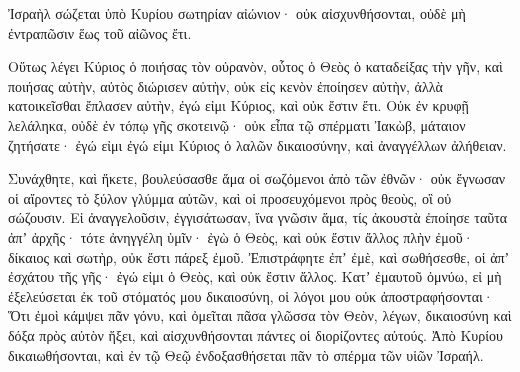 {Ἰσραὴλ σώζεται ὑπὸ Κυρίου σωτηρίαν αἰώνιον· οὐκ αἰσχυνθήσονται, οὐδὲ μὴ ἐντραπῶσιν ἕως τοῦ αἰῶνος ἔτι.
\par }{\PP {}Οὕτως λέγει Κύριος ὁ ποιήσας τὸν οὐρανὸν, οὗτος ὁ Θεὸς ὁ καταδείξας τὴν γῆν, καὶ ποιήσας αὐτὴν, αὐτὸς διώρισεν αὐτὴν, οὐκ εἰς κενὸν ἐποίησεν αὐτὴν, ἀλλὰ κατοικεῖσθαι ἔπλασεν αὐτὴν, ἐγώ εἰμι Κύριος, καὶ οὐκ ἔστιν ἔτι.
Οὐκ ἐν κρυφῇ λελάληκα, οὐδὲ ἐν τόπῳ γῆς σκοτεινῷ· οὐκ εἶπα τῷ σπέρματι Ἰακὼβ, μάταιον ζητήσατε· ἐγώ εἰμι ἐγώ εἰμι Κύριος ὁ λαλῶν δικαιοσύνην, καὶ ἀναγγέλλων ἀλήθειαν.
\par }{\PP {}Συνάχθητε, καὶ ἥκετε, βουλεύσασθε ἅμα οἱ σωζόμενοι ἀπὸ τῶν ἐθνῶν· οὐκ ἔγνωσαν οἱ αἴροντες τὸ ξύλον γλύμμα αὐτῶν, καὶ οἱ προσευχόμενοι πρὸς θεοὺς, οἳ οὐ σώζουσιν.
Εἰ ἀναγγελοῦσιν, ἐγγισάτωσαν, ἵνα γνῶσιν ἅμα, τίς ἀκουστὰ ἐποίησε ταῦτα ἀπʼ ἀρχῆς· τότε ἀνηγγέλη ὑμῖν· ἐγὼ ὁ Θεὸς, καὶ οὐκ ἔστιν ἄλλος πλὴν ἐμοῦ· δίκαιος καὶ σωτὴρ, οὐκ ἔστι πάρεξ ἐμοῦ.
Ἐπιστράφητε ἐπʼ ἐμὲ, καὶ σωθήσεσθε, οἱ ἀπʼ ἐσχάτου τῆς γῆς· ἐγώ εἰμι ὁ Θεὸς, καὶ οὐκ ἔστιν ἄλλος.
Κατʼ ἐμαυτοῦ ὀμνύω, εἰ μὴ ἐξελεύσεται ἐκ τοῦ στόματός μου δικαιοσύνη, οἱ λόγοι μου οὐκ ἀποστραφήσονται· Ὅτι ἐμοὶ κάμψει πᾶν γόνυ, καὶ ὀμεῖται πᾶσα γλῶσσα τὸν Θεὸν,
λέγων, δικαιοσύνη καὶ δόξα πρὸς αὐτὸν ἥξει, καὶ αἰσχυνθήσονται πάντες οἱ διορίζοντες αὐτούς.
Ἀπὸ Κυρίου δικαιωθήσονται, καὶ ἐν τῷ Θεῷ ἐνδοξασθήσεται πᾶν τὸ σπέρμα τῶν υἱῶν Ἰσραήλ.

}

